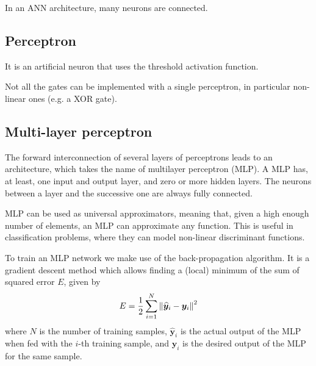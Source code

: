 \documentclass[oneside,onecolumn]{report}
\begin{document}
In an ANN architecture, many neurons are connected.


\subsection{Perceptron}
It is an artificial neuron that uses the threshold activation function.

Not all the gates can be implemented with a single perceptron, in particular non-linear ones (e.g. a XOR gate).


\subsection{Multi-layer perceptron}
The forward interconnection of several layers of perceptrons leads to an architecture, which takes the name of multilayer perceptron (MLP).
A MLP has, at least, one input and output layer, and zero or more hidden layers.
The neurons between a layer and the successive one are always fully connected.

MLP can be used as universal approximators, meaning that, given a high enough number of elements, an MLP can approximate any function.
This is useful in classification problems, where they can model non-linear discriminant functions.

To train an MLP network we make use of the back-propagation algorithm.
It is a gradient descent method which allows finding a (local) minimum of the sum of squared error $E$, given by
$$ E = \frac{1}{2} \sum_{i = 1}^N \norm{\widehat{\bm {y}}_i - \bm y_i}^2 $$
where $N$ is the number of training samples, $\widehat{\bm {y}}_i$ is the actual output of the MLP when fed with the $i$-th training sample, and $\bm y_i$ is the desired output of the MLP for the same sample.
\end{document}
